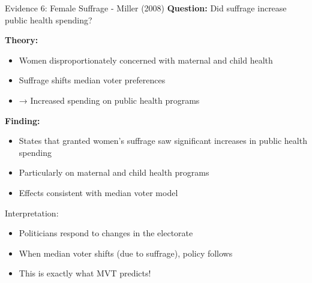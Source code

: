 \documentclass[10pt]{beamer}
\begin{document}
\begin{frame}{Evidence 6: Female Suffrage - Miller (2008)}
\textbf{Question:} Did suffrage increase public health spending?



\textbf{Theory:}
\begin{itemize}
\item Women disproportionately concerned with maternal and child health
\item Suffrage shifts median voter preferences
\item → Increased spending on public health programs
\end{itemize}



\textbf{Finding:}
\begin{itemize}
\item States that granted women's suffrage saw \alert{significant increases} in public health spending
\item Particularly on maternal and child health programs
\item Effects consistent with median voter model
\end{itemize}



\alert{Interpretation:}
\begin{itemize}
\item Politicians respond to changes in the electorate
\item When median voter shifts (due to suffrage), policy follows
\item This is exactly what MVT predicts!
\end{itemize}
\end{frame}
\end{document}
